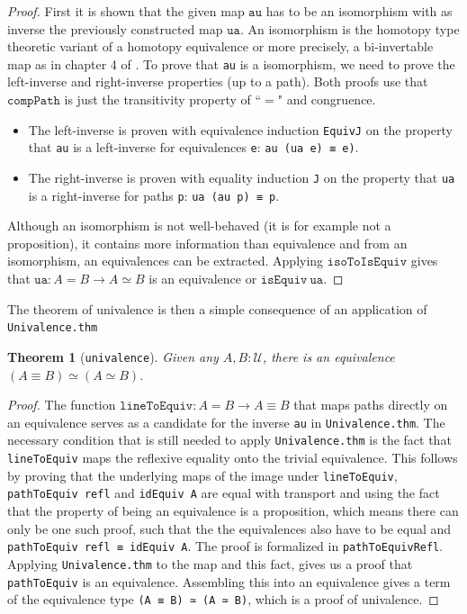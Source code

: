 \documentclass[12pt,a4paper,twoside,xetex]{book}
\newtheorem{theorem}{Theorem}[section]
\newcommand{\op}[1]{\mathtt{#1}}
\begin{document}
\begin{proof}
First it is shown that the given map $\op{au}$ has to be an isomorphism with as inverse the previously constructed map $\op{ua}$. An isomorphism is the homotopy type theoretic variant of a homotopy equivalence or more precisely, a bi-invertable map as in chapter 4 of \cite{Voevodsky2013}. To prove that \texttt{au} is a isomorphism, we need to prove the left-inverse and right-inverse properties (up to a path). Both proofs use that $\op{compPath}$ is just the transitivity property of ``$=$" and congruence. 
\begin{itemize}
\item The left-inverse is proven with equivalence induction \texttt{EquivJ} on the property that \texttt{au} is a left-inverse for equivalences \texttt{e}: \texttt{au (ua e) ≡ e)}. 
\item The right-inverse is proven with equality induction \texttt{J} on the property that \texttt{ua} is a right-inverse for paths \texttt{p}: \texttt{ua (au p) ≡ p}. 
\end{itemize}
Although an isomorphism is not well-behaved (it is for example not a proposition), it contains more information than equivalence and from an isomorphism, an equivalences can be extracted. Applying $\op{isoToIsEquiv}$ gives that $\op{ua} : A = B \rightarrow A \simeq B$ is an equivalence or $\op{isEquiv}\ \op{ua}$. 
\end{proof}

The theorem of univalence is then a simple consequence of an application of \texttt{Univalence.thm}

\begin{theorem}[\texttt{univalence}]
Given any $A,B : \mathcal{U}$, there is an equivalence $\left( A \equiv B \right) \simeq \left( A \simeq B \right).$
\end{theorem}


\begin{proof}
The function $\op{lineToEquiv} : A = B \rightarrow A \equiv B$ that maps paths directly on an equivalence serves as a candidate for the inverse \texttt{au} in \texttt{Univalence.thm}. The necessary condition that is still needed to apply \texttt{Univalence.thm} is the fact that \texttt{lineToEquiv} maps the reflexive equality onto the trivial equivalence. This follows by proving that the underlying maps of the image under \texttt{lineToEquiv}, \texttt{pathToEquiv refl} and \texttt{idEquiv A} are equal with transport and using the fact that the property of being an equivalence is a proposition, which means there can only be one such proof, such that the the equivalences also have to be equal and \texttt{pathToEquiv refl ≡ idEquiv A}. The proof is formalized in \texttt{pathToEquivRefl}. Applying \texttt{Univalence.thm} to the map and this fact, gives us a proof that \texttt{pathToEquiv} is an equivalence. Assembling this into an equivalence gives a term of the equivalence type \texttt{(A ≡ B) ≃ (A ≃ B)}, which is a proof of univalence.
\end{proof}
\end{document}
